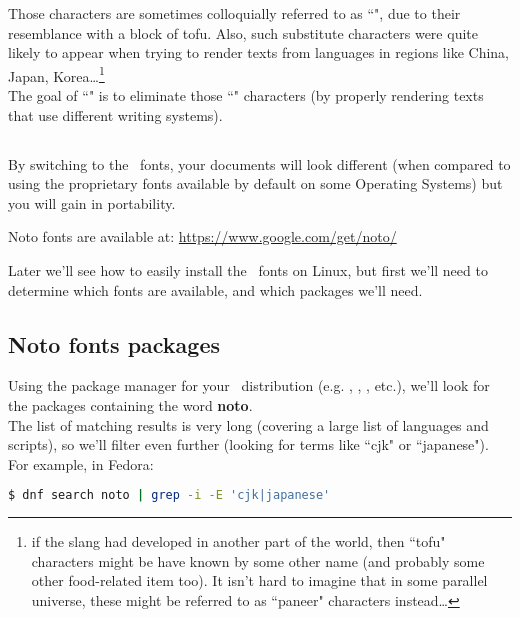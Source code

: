 Those characters are sometimes colloquially referred to as ``\tofu", due to their resemblance with a block of tofu. Also, such substitute characters were quite likely to appear when trying to render texts from languages in regions like China, Japan, Korea\dots\footnote{if the slang had developed in another part of the world, then ``tofu" characters might be have known by some other name (and probably some other food-related item too). It isn't hard to imagine that in some parallel universe, these might be referred to as ``paneer" characters instead\dots
}\\

The goal of ``\Noto" is to eliminate those ``\tofu" characters (by properly rendering texts that use different writing systems).
\\

\subsection*{\Portability}

By switching to the \Noto\ fonts, your documents will look different (when compared to using the proprietary fonts available by default on some Operating Systems) but you will gain in portability.

Noto fonts are available at: \url{https://www.google.com/get/noto/} \\

\newpage

Later we'll see how to easily install the \Noto\ fonts on Linux, but first we'll need to determine which fonts are available, and which packages we'll need.

\bigskip

\subsection*{Noto fonts packages}

Using the package manager for your \linux\ distribution (e.g. , , , etc.), we'll look for the packages containing the word \textbf{noto}.\\

The list of matching results is very long (covering a large list of languages and scripts), so we'll filter even further (looking for terms like ``cjk" or ``japanese"). \\

For example, in Fedora:
\begin{lstlisting}[language=sh]
$ dnf search noto | grep -i -E 'cjk|japanese'
\end{lstlisting}

